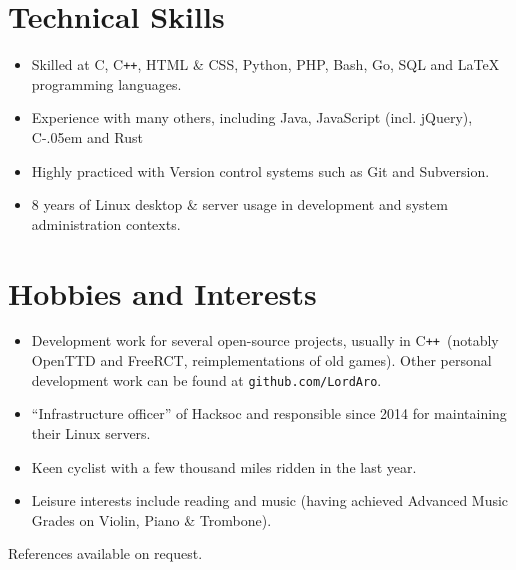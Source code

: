\documentclass[11pt,a4paper]{article}
\newcommand{\cpp}{C{}\texttt{++}}
\newcommand{\cs}{\settoheight{\dimen0}{C}C\kern-.05em \resizebox{!}{\dimen0}{\raisebox{\depth}{\textbf{\#}}}}
\begin{document}
\section{Technical Skills}
\begin{itemize}%
  \item Skilled at C, \cpp, HTML \& CSS, Python, PHP, Bash, Go, SQL and \LaTeX{}
    programming languages.
  \item Experience with many others, including Java, JavaScript (incl. jQuery),
    \cs{} and Rust
  \item Highly practiced with Version control systems such as Git and
    Subversion.
  \item 8 years of Linux desktop \& server usage in development and system
    administration contexts.
\end{itemize}

\section{Hobbies and Interests}
\begin{itemize}%
  \item Development work for several open-source projects, usually in
    \cpp~(notably OpenTTD and FreeRCT, reimplementations of old games). Other
    personal development work can be found at \texttt{github.com/LordAro}.
  \item ``Infrastructure officer'' of Hacksoc and responsible since 2014 for
    maintaining their Linux servers.
  \item Keen cyclist with a few thousand miles ridden in the last year.
  \item Leisure interests include reading and music (having achieved
    Advanced Music Grades on Violin, Piano \& Trombone).
\end{itemize}

\noindent{}References available on request.
\end{document}
